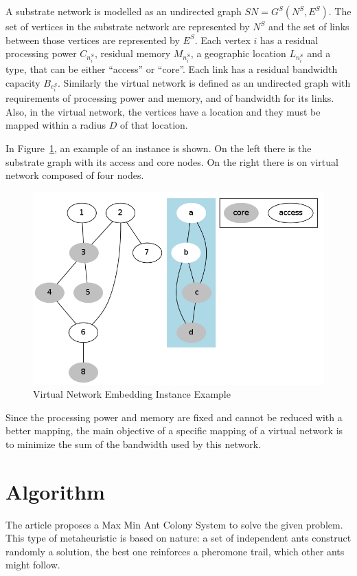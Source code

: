 \documentclass[11pt, a4paper]{article}
\begin{document}
A substrate network is modelled as an undirected graph $SN = G^{S}(N^{S}, E^{S})$. The set of vertices in the substrate network are represented by $N^{S}$ and the set of links between those vertices are represented by $E^{S}$. Each vertex $i$ has a residual processing power $C_{n^{S}_{i}}$, residual memory $M_{n^{S}_{i}}$, a geographic location $L_{n^{S}_{i}}$ and a type, that can be either ``access'' or ``core''. Each link has a residual bandwidth capacity $B_{e^{S}_{i}}$. Similarly the virtual network is defined as an undirected graph with requirements of processing power and memory, and of bandwidth for its links. Also, in the virtual network, the vertices have a location and they must be mapped within a radius $D$ of that location.

In Figure~\ref{example}, an example of an instance is shown. On the left there is the substrate graph with its access and core nodes. On the right there is on virtual network composed of four nodes.

\begin{figure}[h]
  \centering
  \includegraphics[scale=0.35]{g1.png}
  \caption{Virtual Network Embedding Instance Example }\label{example}
\end{figure}

Since the processing power and memory are fixed and cannot be reduced with a better mapping, the main objective of a specific mapping of a virtual network is to minimize the sum of the bandwidth used by this network.

\section{Algorithm}
The article proposes a Max Min Ant Colony System to solve the given problem. This type of metaheuristic is based on nature: a set of independent ants construct randomly a solution, the best one reinforces a pheromone trail, which other ants might follow.
\end{document}
